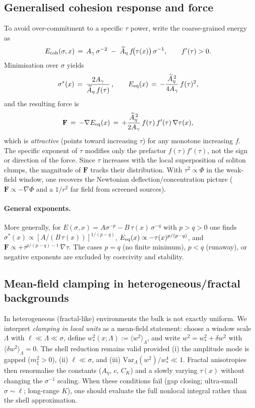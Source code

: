 \documentclass[11pt]{article}
\begin{document}
\subsection*{Generalised cohesion response and force}
To avoid over-commitment to a specific $\tau$ power, write the coarse-grained energy as
\begin{equation}
  E_{\rm coh}(\sigma,x) \,=\, A_{\gamma}\,\sigma^{-2} \; -\; \widetilde A_{\eta}\, f\!\big(\tau(x)\big)\,\sigma^{-1},\qquad f'(\tau)>0.
\end{equation}
Minimisation over $\sigma$ yields
\begin{equation}
  \sigma^*(x) \,=\, \frac{2A_{\gamma}}{\widetilde A_{\eta}\, f(\tau)}\,,\qquad
  E_{\rm eq}(x) \,=\, -\frac{\widetilde A_{\eta}^{\,2}}{4A_{\gamma}}\, f(\tau)^2,
\end{equation}
and the resulting force is
\begin{equation}
  \mathbf F \,=\, -\nabla E_{\rm eq}(x) \,=\, +\frac{\widetilde A_{\eta}^{\,2}}{2A_{\gamma}}\, f(\tau)\, f'(\tau)\, \nabla\tau(x),
\end{equation}
which is \emph{attractive} (points toward increasing $\tau$) for any monotone increasing $f$. The specific exponent of $\tau$ modifies only the prefactor $f(\tau)f'(\tau)$, not the sign or direction of the force. Since $\tau$ increases with the local superposition of soliton clumps, the magnitude of $\mathbf F$ tracks their distribution. With $\tau^2\propto \Phi$ in the weak-field window, one recovers the Newtonian deflection/concentration picture ($\mathbf F\propto -\nabla\Phi$ and a $1/r^2$ far field from screened sources).

\paragraph{General exponents.} More generally, for $E(\sigma,x)=A\sigma^{-p}-B\,\tau(x)\,\sigma^{-q}$ with $p>q>0$ one finds $\sigma^*(x)\propto [A/(B\,\tau(x))]^{1/(p-q)}$, $E_{\rm eq}(x)\propto -\tau(x)^{p/(p-q)}$, and $\mathbf F\propto +\tau^{p/(p-q)-1}\,\nabla\tau$. The cases $p=q$ (no finite minimum), $p<q$ (runaway), or negative exponents are excluded by coercivity and stability.

\subsection*{Mean-field clamping in heterogeneous/fractal backgrounds}
In heterogeneous (fractal-like) environments the bulk is not exactly uniform. We interpret \emph{clamping in local units} as a mean-field statement: choose a window scale $\Lambda$ with $\ell\ll\Lambda\ll\sigma$, define $w_*^2(x;\Lambda):=\langle w^2\rangle_{\Lambda}$, and write $w^2= w_*^2+\delta w^2$ with $\langle\delta w^2\rangle_{\Lambda}=0$. The shell reduction remains valid provided (i) the amplitude mode is gapped ($m_\xi^2>0$), (ii) $\ell\ll\sigma$, and (iii) $\mathrm{Var}_{\Lambda}(w^2)/w_*^4\ll1$. Fractal anisotropies then renormalise the constants ($A_\eta$, $c$, $C_K$) and a slowly varying $\tau(x)$ without changing the $\sigma^{-1}$ scaling. When these conditions fail (gap closing; ultra-small $\sigma\sim\ell$; long-range $K$), one should evaluate the full nonlocal integral rather than the shell approximation.




\end{document}
